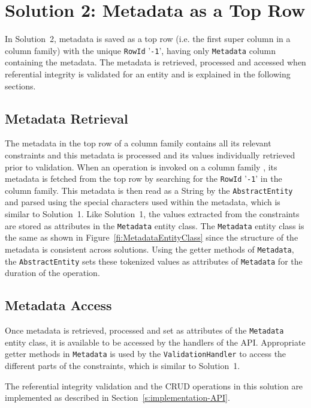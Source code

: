\section{Solution 2:  Metadata as a Top Row}\label{s:Implementation-Solution2}
	

In Solution~2,  metadata is saved as a top row (i.e. the first super column in a
column family) with the unique \texttt{RowId} '\texttt{-1}', having  only
\texttt{Metadata} column containing the metadata. The metadata
 is retrieved, processed and accessed when referential integrity is
validated for an entity and  is explained in the following sections.


\subsection{Metadata Retrieval}

The metadata in the top row of a column family contains all its relevant
constraints and  this metadata is processed and its values  individually
retrieved prior to validation. When an operation is invoked on a column family ,
its metadata is fetched from the top row by searching for the \texttt{RowId} '\texttt{-1}' in
the column family. This metadata is then read as a String by the
\texttt{AbstractEntity} and parsed using the special characters used within the
metadata, which is similar to Solution~1.
Like Solution~1, the values extracted from the constraints are stored as
attributes in the \texttt{Metadata} entity class. The \texttt{Metadata} entity
class is the same as shown in Figure~\ref{fi:MetadataEntityClass} since the
structure of the metadata is consistent across solutions. Using the getter
methods of \texttt{Metadata}, the \texttt{AbstractEntity} sets these tokenized
values as attributes of  \texttt{Metadata}  for the duration of the operation.


\subsection{Metadata Access}

Once  metadata is retrieved, processed and set as attributes of the
\texttt{Metadata} entity class, it is available to be accessed by the handlers
of the \ac{API}. Appropriate getter methods in \texttt{Metadata} is used by the
\texttt{ValidationHandler} to access the different parts of the constraints,
which is similar to Solution~1.

The referential integrity validation and the \ac{CRUD} operations in this
solution are implemented as described in Section~\ref{s:implementation-API}.
	

